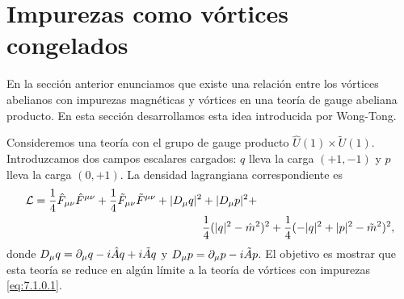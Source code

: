 \section{Impurezas como vórtices congelados}

En la sección anterior enunciamos que existe una relación entre los vórtices abelianos con impurezas magnéticas y vórtices en una teoría de gauge abeliana producto. En esta sección desarrollamos esta idea introducida por Wong-Tong.

Consideremos una teoría con el grupo de gauge producto $\hat U(1)\times \tilde U(1)$. Introduzcamos dos campos escalares cargados: $q$ lleva la carga $(+1,-1)$ y $p$ lleva la carga $(0,+1)$. La densidad lagrangiana correspondiente es
\begin{align}
	\mathcal{L} = \frac{1}{4}\hat F_{\mu\nu}\hat F^{\mu\nu}+\frac{1}{4}\tilde F_{\mu\nu}\tilde F^{\mu\nu}+|D_\mu q|^2 & +|D_\mu p|^2+\nonumber                                     \\
	                                                                                                & \frac{1}{4}(|q|^2-\hat m^2)^2+\frac{1}{4}(-|q|^2+|p|^2-\tilde m^2)^2,
\end{align}
donde $D_\mu q=\partial_\mu q-i \hat Aq+i\tilde A q$ y $D_\mu p=\partial_\mu p-i\tilde A p$. El objetivo es mostrar que esta teoría se reduce en algún límite a la teoría de vórtices con impurezas \eqref{eq:7.1.0.1}.


